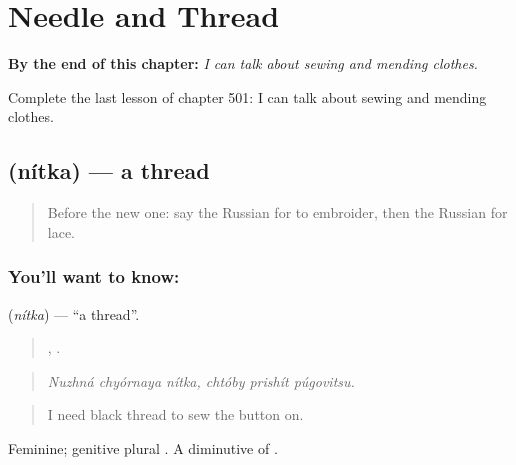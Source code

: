 
\chapter{Needle and Thread}
\label{ch:ru-needle-and-thread}

\begin{chapteropening}
\textbf{By the end of this chapter:} \emph{I can talk about sewing and mending clothes.}

Complete the last lesson of chapter 501: I can talk about sewing and mending clothes.
\end{chapteropening}

\section[\texorpdfstring{\ru{нитка} (nítka)}{нитка (nítka)}]{ (nítka) — a thread}

\label{lesson:RU-C501-nitka}



\begin{quote}
Before the new one: say the Russian for to embroider, then the Russian for lace.
\end{quote}

\subsection*{You'll want to know: }
\textbf{} (\emph{nítka}) — \textquotedblleft{}a thread\textquotedblright{}.

\begin{quote}
  ,   .
\end{quote}

\begin{quote}
\emph{Nuzhná chyórnaya nítka, chtóby prishít púgovitsu.}
\end{quote}

\begin{quote}
I need black thread to sew the button on.
\end{quote}

Feminine; genitive plural . A diminutive of \emph{}.

